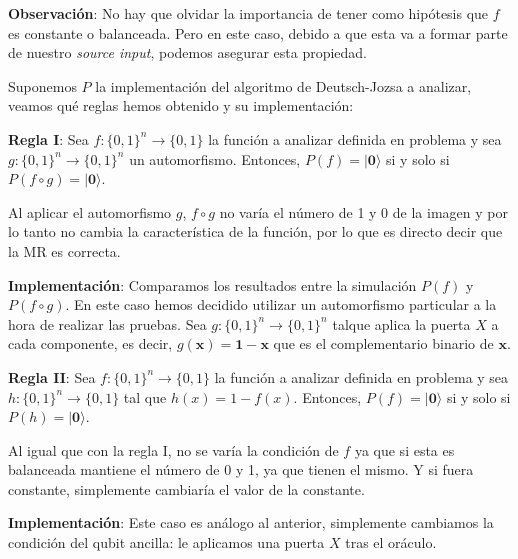 \vspace{12pt}

\textbf{Observación}: No hay que olvidar la importancia de tener como hipótesis que $f$ es constante o balanceada. Pero en este caso, debido a que esta va a formar parte de nuestro \textit{source input}, podemos asegurar esta propiedad. \newline

Suponemos $P$ la implementación del algoritmo de Deutsch-Jozsa a analizar, veamos qué reglas hemos obtenido y su implementación: \newline


\textbf{Regla I}: Sea $f:\{0,1\}^{n} \rightarrow\{0,1\}$ la función a analizar definida en problema y sea $g : \{0,1\}^{n} \rightarrow \{0,1\}^{n}$ un automorfismo. Entonces, $P(f)=|\mathbf{0}\rangle$ si y solo si $P(f\circ g)=|\mathbf{0}\rangle$.\newline

Al aplicar el automorfismo $g$, $f \circ g$ no varía el número de 1 y 0 de la imagen y por lo tanto no cambia la característica de la función, por lo que es directo decir que la MR es correcta.\newline

\textbf{Implementación}: Comparamos los resultados entre la simulación $P(f)$ y $P(f\circ g)$. En este caso hemos decidido utilizar un automorfismo particular a la hora de realizar las pruebas. Sea $g: \{0,1\}^{n} \rightarrow \{0,1\}^{n}$ talque aplica la puerta $X$ a cada componente, es decir, $g(\mathbf{x})=\mathbf{1}-\mathbf{x}$ que es el complementario binario de $\mathbf{x}$.\newline



\textbf{Regla II}: Sea $f:\{0,1\}^{n} \rightarrow\{0,1\}$ la función a analizar definida en problema y sea $h:\{0,1\}^{n} \rightarrow\{0,1\}$ tal que $h(x) = 1 - f(x)$. Entonces, $P(f)=|\mathbf{0}\rangle$ si y solo si $P(h)=|\mathbf{0}\rangle$. \newline

Al igual que con la regla I, no se varía la condición de $f$ ya que si esta es balanceada mantiene el número de 0 y 1, ya que tienen el mismo. Y si fuera constante, simplemente cambiaría el valor de la constante.\newline

\textbf{Implementación}: Este caso es análogo al anterior, simplemente cambiamos la condición del qubit ancilla: le aplicamos una puerta $X$ tras el oráculo.\newline

